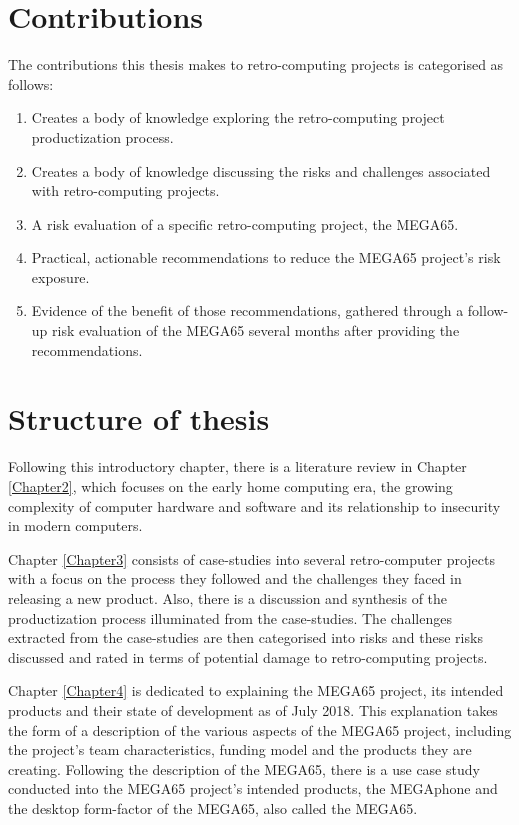 \section{Contributions}
\label{contributions}
The contributions this thesis makes to retro-computing projects is categorised as follows:
\begin{enumerate}
\item Creates a body of knowledge exploring the retro-computing project productization process.
\item Creates a body of knowledge discussing the risks and challenges associated with retro-computing projects.
\item A risk evaluation of a specific retro-computing project, the MEGA65.
\item Practical, actionable recommendations to reduce the MEGA65 project's risk exposure.
\item Evidence of the benefit of those recommendations, gathered through a follow-up risk evaluation of the MEGA65 several months after providing the recommendations.
\end{enumerate}

\section{Structure of thesis}
Following this introductory chapter, there is a literature review in Chapter \ref{Chapter2}, which focuses on the early home computing era, the growing complexity of computer hardware and software and its relationship to insecurity in modern computers. 

Chapter \ref{Chapter3} consists of case-studies into several retro-computer projects with a focus on the process they followed and the challenges they faced in releasing a new product. Also, there is a discussion and synthesis of the productization process illuminated from the case-studies. The challenges extracted from the case-studies are then categorised into risks and these risks discussed and rated in terms of potential damage to retro-computing projects. 

Chapter \ref{Chapter4} is dedicated to explaining the MEGA65 project, its intended products and their state of development as of July 2018. This explanation takes the form of a description of the various aspects of the MEGA65 project, including the project's team characteristics, funding model and the products they are creating. Following the description of the MEGA65, there is a use case study conducted into the MEGA65 project's intended products, the MEGAphone and the desktop form-factor of the MEGA65, also called the MEGA65. 

